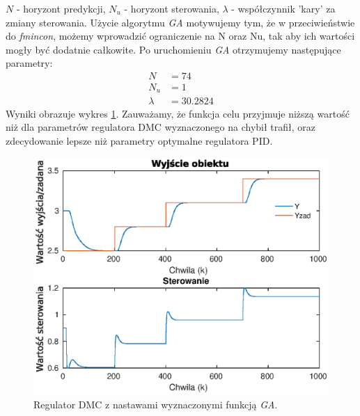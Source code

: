 $N$ - horyzont predykcji,
$N_u$ - horyzont sterowania,
$\lambda$ - współczynnik 'kary' za zmiany sterowania.
Użycie algorytmu \emph{GA} motywujemy tym, że w przeciwieństwie do \emph{fmincon}, możemy wprowadzić ograniczenie na N oraz Nu, tak aby ich wartości mogły być dodatnie całkowite.
Po uruchomieniu \emph{GA} otrzymujemy następujące parametry:
\begin{align}
  N &= 74 \nonumber \\
  N_u &= 1 \\
  \lambda &= 30.2824 \nonumber
\end{align}
Wyniki obrazuje wykres \ref{fig:optim_dmc}.
Zauważamy, że funkcja celu przyjmuje niższą wartość niż dla parametrów regulatora DMC wyznaczonego na chybił trafił, oraz zdecydowanie lepsze niż parametry optymalne regulatora PID.
\begin{figure}
  \includegraphics{wykresy/optim_dmc.eps}
  \caption{Regulator DMC z nastawami wyznaczonymi funkcją \emph{GA}.}
  \label{fig:optim_dmc}
\end{figure}
